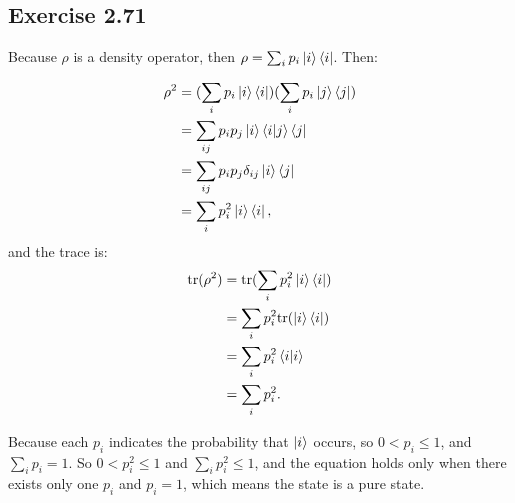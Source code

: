 \subsection*{Exercise 2.71}
 Because $\rho$ is a density operator, then $\rho = \sum_i p_i\ket{i}\bra{i}$. Then:
 
 \begin{align}
\rho ^2 &= (\sum_i p_i\ket{i}\bra{i})(\sum_i p_i\ket{j}\bra{j})\\
&= \sum_{ij}p_ip_j\ket{i}\bra{i}\ket{j}\bra{j}\\
&= \sum_{ij}p_ip_j\delta_{ij}\ket{i}\bra{j}\\
&= \sum_{i}p_i^2\ket{i}\bra{i},
\end{align}
and the trace is:
 \begin{align}
{\rm tr}(\rho ^2)
&= {\rm tr}(\sum_{i}p_i^2\ket{i}\bra{i})\\
&=\sum_{i}p_i^2{\rm tr}(\ket{i}\bra{i})\\
&=\sum_{i}p_i^2\bra{i}\ket{i}\\
&=\sum_{i}p_i^2.
\end{align}

Because each $p_i$ indicates the probability that $\ket{i}$ occurs, so $0<p_i\leq 1$, and $\sum_i p_i = 1$. So $0<p_i^2\leq 1$ and $\sum_i p_i^2\leq 1$, and the equation holds only when there exists only one $p_i$ and $p_i = 1$, which means the state is a pure state.

